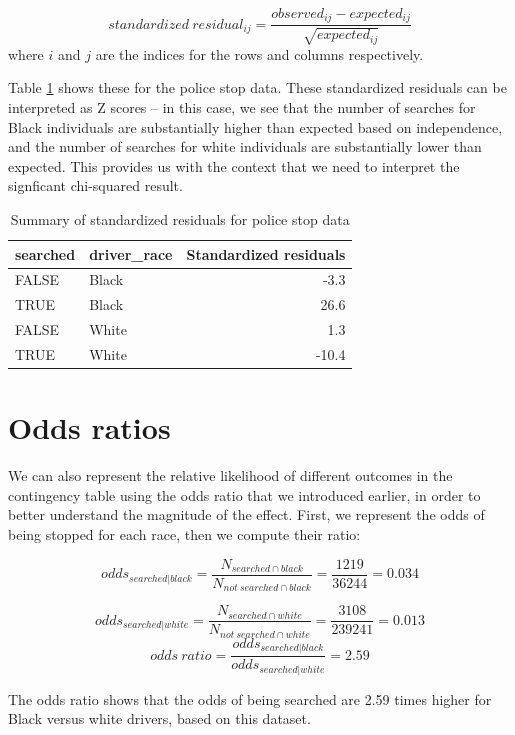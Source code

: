 \documentclass[12pt,]{book}
\theoremstyle{definition}
\theoremstyle{definition}
\theoremstyle{definition}
\theoremstyle{remark}
\begin{document}
\[
standardized\ residual_{ij} = \frac{observed_{ij} - expected_{ij}}{\sqrt{expected_{ij}}}
\]
where \(i\) and \(j\) are the indices for the rows and columns respectively.

Table \ref{tab:stdRes} shows these for the police stop data. These standardized residuals can be interpreted as Z scores -- in this case, we see that the number of searches for Black individuals are substantially higher than expected based on independence, and the number of searches for white individuals are substantially lower than expected. This provides us with the context that we need to interpret the signficant chi-squared result.

\begin{table}

\caption{\label{tab:stdRes}Summary of standardized residuals for police stop data}
\centering
\begin{tabular}[t]{l|l|r}
\hline
searched & driver\_race & Standardized residuals\\
\hline
FALSE & Black & -3.3\\
\hline
TRUE & Black & 26.6\\
\hline
FALSE & White & 1.3\\
\hline
TRUE & White & -10.4\\
\hline
\end{tabular}
\end{table}

\hypertarget{odds-ratios}{%
\section{Odds ratios}\label{odds-ratios}}

We can also represent the relative likelihood of different outcomes in the contingency table using the odds ratio that we introduced earlier, in order to better understand the magnitude of the effect. First, we represent the odds of being stopped for each race, then we compute their ratio:

\[
odds_{searched|black} = \frac{N_{searched\cap black}}{N_{not\ searched\cap black}} = \frac{1219}{36244} = 0.034
\]

\[
odds_{searched|white} = \frac{N_{searched\cap white}}{N_{not\ searched\cap white}} = \frac{3108}{239241} = 0.013
\]
\[
odds\ ratio = \frac{odds_{searched|black}}{odds_{searched|white}} = 2.59
\]

The odds ratio shows that the odds of being searched are 2.59 times higher for Black versus white drivers, based on this dataset.
\end{document}
